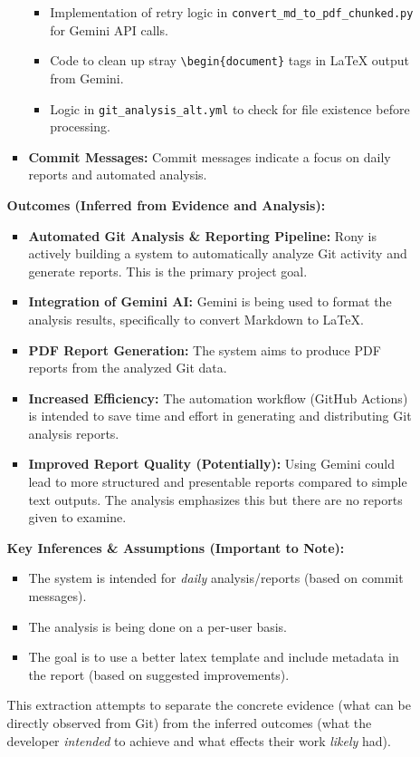 \documentclass{article}
\begin{document}
\begin{itemize}
\begin{itemize}
\begin{itemize}
\begin{itemize}
        \item Implementation of retry logic in \texttt{convert\_md\_to\_pdf\_chunked.py} for Gemini API calls.
        \item Code to clean up stray \texttt{\textbackslash begin\{document\}} tags in LaTeX output from Gemini.
        \item Logic in \texttt{git\_analysis\_alt.yml} to check for file existence before processing.
    \end{itemize}
    \item \textbf{Commit Messages:} Commit messages indicate a focus on daily reports and automated analysis.
\end{itemize}
\textbf{Outcomes (Inferred from Evidence and Analysis):}
\begin{itemize}
    \item \textbf{Automated Git Analysis \& Reporting Pipeline:} Rony is actively building a system to automatically analyze Git activity and generate reports. This is the primary project goal.
    \item \textbf{Integration of Gemini AI:} Gemini is being used to format the analysis results, specifically to convert Markdown to LaTeX.
    \item \textbf{PDF Report Generation:} The system aims to produce PDF reports from the analyzed Git data.
    \item \textbf{Increased Efficiency:} The automation workflow (GitHub Actions) is intended to save time and effort in generating and distributing Git analysis reports.
    \item \textbf{Improved Report Quality (Potentially):}  Using Gemini could lead to more structured and presentable reports compared to simple text outputs. The analysis emphasizes this but there are no reports given to examine.
\end{itemize}
\textbf{Key Inferences \& Assumptions (Important to Note):}
\begin{itemize}
    \item The system is intended for \textit{daily} analysis/reports (based on commit messages).
    \item The analysis is being done on a per-user basis.
    \item The goal is to use a better latex template and include metadata in the report (based on suggested improvements).
\end{itemize}
This extraction attempts to separate the concrete evidence (what can be directly observed from Git) from the inferred outcomes (what the developer \textit{intended} to achieve and what effects their work \textit{likely} had).

\end{itemize}
\end{itemize}
\end{document}
